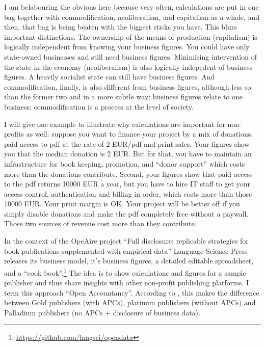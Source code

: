 \documentclass[12pt]{article}
\begin{document}
I am belabouring the obvious here because very often, calculations are put in one bag together with commodification, neoliberalism, and capitalism as a whole, and then, that bag is being beaten  with the biggest sticks you have. This blurs important distinctions. The ownership of the means of production (capitalism) is logically independent from knowing your business figures. You could have only state-owned businesses and still need business figures. Minimising intervention of the state in the economy (neoliberalism) is also logically indepedent of business figures. A heavily socialist state can still have business figures. And commodification, finally, is also different from business figures, although less so than the former two and in a more subtle way: business figures relate to one business; commodification is a process at the level of society.

I will give one example to illustrate why calculations are important for non-profits as well: suppose you want to finance your project by a mix of donations, paid access to pdf at the rate of 2 EUR/pdf and print sales. Your figures show you that the median donation is 2 EUR. But for that, you have to maintain an infrastructure for book keeping, promotion, and ``donor support'' which costs more than the donations contribute. Second, your figures show that paid access to the pdf returns 10000 EUR a year, but you have to hire IT staff to get your access control, authentication and billing in order, which costs more than those 10000 EUR. Your print margin is OK. Your project will be better off if you simply disable donations and make the pdf completely free without a paywall. Those two sources of revenue cost more than they contribute. 

In the context of the OpeAire project ``Full disclosure: replicable strategies for book publications supplemented with empirical data'' Language Science Press releases its business model, it's business figures, a detailed editable spreadsheet, and a ``cook book''.\footnote{\url{https://github.com/langsci/opendata}} The idea is to show calculations and figures for a sample publisher and thus share insights with other non-profit publishing platforms. I term this approach ``Open Accountancy''. According to \citet{Caux2017}, this makes the difference between Gold publishers (with APCs), platinum publishers (without APCs) and Palladium publishers (no APCs + disclosure of business data). 
\end{document}
